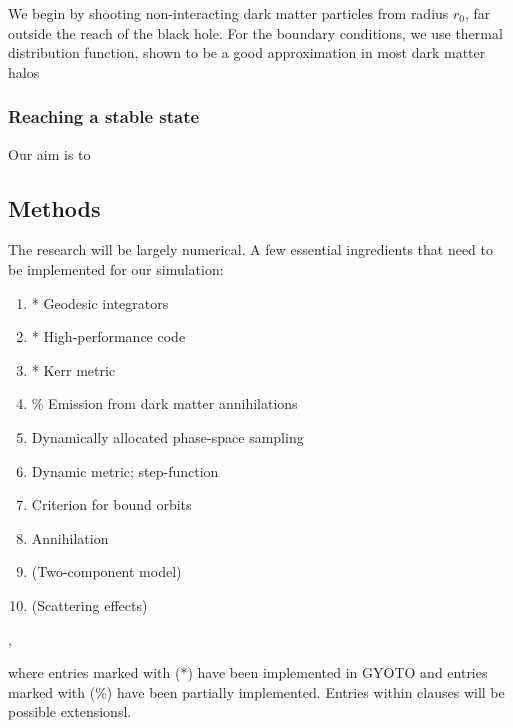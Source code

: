 \documentclass[12pt]{article}
\begin{document}

We begin by shooting non-interacting dark matter particles from radius $r_0$, far outside the reach of the black hole. 
For the boundary conditions, we use thermal distribution function, shown to be a good approximation in most 
dark matter halos


\subsubsection{Reaching a stable state}


Our aim is to 


\subsection{Methods}



The research will be largely numerical. A few essential ingredients that need to be implemented for our simulation:

\begin{enumerate}
 \item * Geodesic integrators
 \item * High-performance code %
 \item * Kerr metric
 \item \% Emission from dark matter annihilations
 \item Dynamically allocated phase-space sampling
 \item Dynamic metric; step-function
 \item Criterion for bound orbits
 \item Annihilation
 \item (Two-component model)
 \item (Scattering effects)
\end{enumerate},

where entries marked with (*) have been implemented in GYOTO \citep{gyoto_vincent_2011} and entries marked with (\%) have been partially implemented. 
Entries within clauses will be possible extensionsl.
\end{document}
